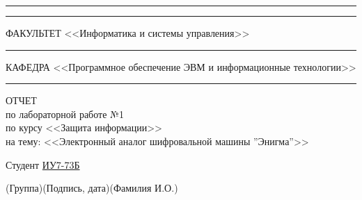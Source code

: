 \begin{titlepage}
	\vspace{-2pt}
	\hspace{-34.5pt}\rule{\textwidth}{2.5pt}
	
	\vspace*{-20.3pt}
	\hspace{-34.5pt}\rule{\textwidth}{0.4pt}
	
	\vspace{0.5ex}
	\noindent \small ФАКУЛЬТЕТ\hspace{80pt} <<Информатика и системы управления>>
	
	\vspace*{-16pt}
	\hspace{35pt}\rule{0.855\textwidth}{0.4pt}
	
	\vspace{0.5ex}
	\noindent \small КАФЕДРА\hspace{50pt} <<Программное обеспечение ЭВМ и информационные технологии>>
	
	\vspace*{-16pt}
	\hspace{25pt}\rule{0.875\textwidth}{0.4pt}
	
	
	\vspace{3em}
	
	\begin{center}
		\Large {ОТЧЕТ}\\
		\normalsize по лабораторной работе №1\\
		по курсу <<Защита информации>>\\
		на тему: <<Электронный аналог шифровальной машины ''Энигма''>>
	\end{center}

	\vspace{\fill}
	
	
	\newlength{\ML}
	
	\noindent Студент \underline{ИУ7-73Б} \hfill \underline{\hspace{4cm}}\quad
	\underline{}
	
	\vspace{-2.1ex}
	\noindent\hspace{9ex}\scriptsize{(Группа)}\normalsize\hspace{170pt}\hspace{2ex}\scriptsize{(Подпись, дата)}\normalsize\hspace{30pt}\hspace{6ex}\scriptsize{(Фамилия И.О.)}\normalsize
	

\end{titlepage}
